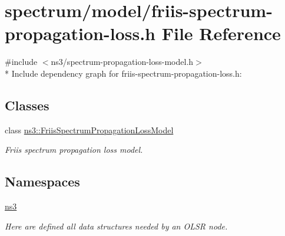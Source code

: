 \hypertarget{friis-spectrum-propagation-loss_8h}{}\section{spectrum/model/friis-\/spectrum-\/propagation-\/loss.h File Reference}
\label{friis-spectrum-propagation-loss_8h}
{\ttfamily \#include $<$ns3/spectrum-\/propagation-\/loss-\/model.\+h$>$}\\*
Include dependency graph for friis-\/spectrum-\/propagation-\/loss.h\+:
\subsection*{Classes}
\begin{DoxyCompactItemize}
\item 
class \hyperlink{classns3_1_1FriisSpectrumPropagationLossModel}{ns3\+::\+Friis\+Spectrum\+Propagation\+Loss\+Model}
\begin{DoxyCompactList}\small\item\em Friis spectrum propagation loss model. \end{DoxyCompactList}\end{DoxyCompactItemize}
\subsection*{Namespaces}
\begin{DoxyCompactItemize}
\item 
 \hyperlink{namespacens3}{ns3}
\begin{DoxyCompactList}\small\item\em Here are defined all data structures needed by an O\+L\+SR node. \end{DoxyCompactList}\end{DoxyCompactItemize}
